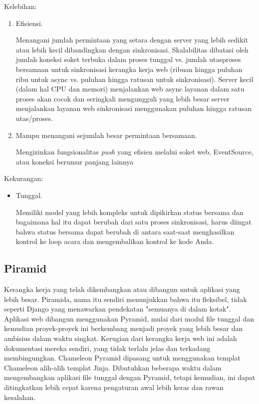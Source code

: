 Kelebihan:
\begin{enumerate}
\item Efisiensi.

Menangani jumlah permintaan yang setara dengan server yang lebih sedikit atau lebih kecil dibandingkan dengan sinkronisasi. Skalabilitas dibatasi oleh jumlah koneksi soket terbuka dalam proses tunggal vs. jumlah utas\/proses bersamaan untuk sinkronisasi kerangka kerja web (ribuan hingga puluhan ribu untuk async vs. puluhan hingga ratusan untuk sinkronisasi). Server kecil (dalam hal CPU dan memori) menjalankan web async layanan dalam satu proses akan cocok dan seringkali mengungguli yang lebih besar server menjalankan layanan web sinkronisasi menggunakan puluhan hingga ratusan utas/proses.

\item Mampu menangani sejumlah besar permintaan bersamaan.

Mengizinkan fungsionalitas \textit{push} yang efisien melalui soket web, EventSource, atau koneksi berumur panjang lainnya
\end{enumerate}

Kekurangan:
\begin{itemize}
\item Tunggal.

Memiliki model yang lebih kompleks untuk dipikirkan status bersama dan bagaimana hal itu dapat berubah dari satu proses sinkronisasi, harus diingat bahwa status bersama dapat berubah di antara saat-saat menghasilkan kontrol ke loop acara dan mengembalikan kontrol ke kode Anda.
\end{itemize}

\subsection{Piramid}

Kerangka kerja yang telah dikembangkan atau dibangun untuk aplikasi yang lebih besar. Piramida, nama itu sendiri menunjukkan bahwa itu fleksibel, tidak seperti Django yang menawarkan pendekatan "semuanya di dalam kotak". Aplikasi web dibangun menggunakan Pyramid, mulai dari modul file tunggal dan kemudian proyek-proyek ini berkembang menjadi proyek yang lebih besar dan ambisius dalam waktu singkat. Kerugian dari kerangka kerja web ini adalah dokumentasi mereka sendiri, yang tidak terlalu jelas dan terkadang membingungkan. Chameleon Pyramid dipasang untuk menggunakan templat Chameleon alih-alih templat Jinja. Dibutuhkan beberapa waktu dalam mengembangkan aplikasi file tunggal dengan Pyramid, tetapi kemudian, ini dapat ditingkatkan lebih cepat karena pengaturan awal lebih keras dan rawan kesalahan.

